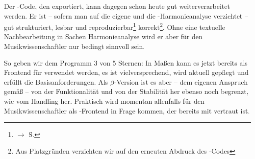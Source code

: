 Der -Code, den  exportiert, kann dagegen schon heute
gut weiterverarbeitet werden. Er ist -- sofern man auf die eigene und die
-Harmonieanalyse verzichtet -- gut strukturiert, lesbar und
reproduzierbar\footnote{$\rightarrow$ S.\pageref{ExportVerifikation}}
korrekt\footnote{Aus Platzgründen verzichten wir auf den erneuten Abdruck des
-Codes}. Ohne eine textuelle Nachbearbeitung in Sachen
Harmonieanalyse wird er aber für den Musikwissenschaftler nur bedingt sinnvoll
sein.

So geben wir dem Programm 3 von 5 Sternen: In Maßen kann es jetzt bereits als
Frontend für  verwendet werden, es ist vielversprechend, wird
aktuell gepflegt und erfüllt die Basisanforderungen. Als $\beta$-Version ist es
aber -- dem eigenen Anspruch gemäß -- von der Funktionalität und von der
Stabilität her ebenso noch begrenzt, wie vom Handling her. Praktisch wird
 momentan allenfalls für den Musikwissenschaftler als
-Frontend in Frage kommen, der bereits mit  vertraut
ist.


%
